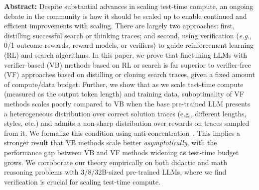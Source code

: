 
\vspace{-0.05cm}

\textbf{Abstract:} Despite substantial advances in scaling test-time compute, an ongoing debate in the community is how it should be scaled up to enable continued and efficient improvements with scaling. There are largely two approaches: first, distilling successful search or thinking traces; and second, using verification (\textit{e.g.}, 0/1 outcome rewards, reward models, or verifiers) to guide reinforcement learning (RL) and search algorithms. In this paper, we prove that finetuning LLMs with verifier-based (VB) methods based on RL or search is far superior to verifier-free (VF) approaches based on distilling or cloning search traces, given a fixed amount of compute/data budget. Further, we show that as we scale test-time compute (measured as the output token length) and training data, suboptimality of VF methods scales poorly compared to VB when the base pre-trained LLM presents a heterogeneous distribution over correct solution traces (e.g., different lengths, styles, etc.) and admits a non-sharp distribution over rewards on traces sampled from it. We formalize this condition using anti-concentration~\cite{erdos1945lemma}. This implies a stronger result that VB methods scale better \emph{asymptotically}, with the performance gap between VB and VF methods widening as test-time budget grows.
We corroborate our theory empirically on both didactic and math reasoning problems with 3/8/32B-sized pre-trained LLMs, where we find verification is crucial for scaling test-time compute.




